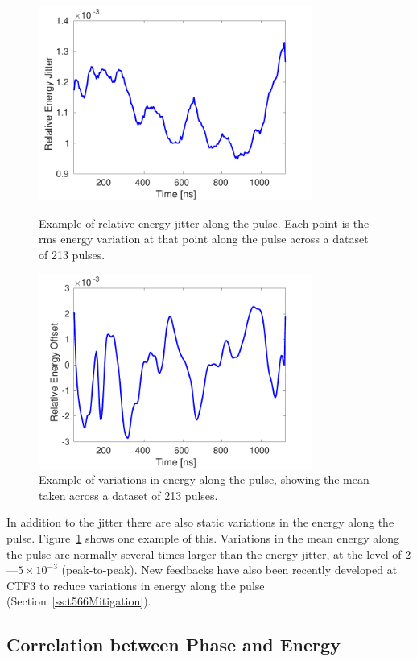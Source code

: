 \begin{figure}
  \centering
  \includegraphics[width=0.8\textwidth]{Figures/propagation/enJitter_along}
  \caption{Example of relative energy jitter along the pulse. Each point is the rms energy variation at that point along the pulse across a dataset of 213 pulses.}
  \label{f:enJitter_along}
  \includegraphics[width=0.8\textwidth]{Figures/propagation/enMeanAlong}
  \caption{Example of variations in energy along the pulse, showing the mean taken across a dataset of 213 pulses.}
  \label{f:enMeanAlong}
\end{figure}

In addition to the jitter there are also static variations in the energy along the pulse. Figure~\ref{f:enMeanAlong} shows one example of this. Variations in the mean energy along the pulse are normally several times larger than the energy jitter, at the level of 2---\(5\times 10^{-3}\) (peak-to-peak). New feedbacks have also been recently developed at CTF3 to reduce variations in energy along the pulse (Section~\ref{ss:t566Mitigation}).

\subsection{Correlation between Phase and Energy}
\label{ss:corrPhaseEnergy}

